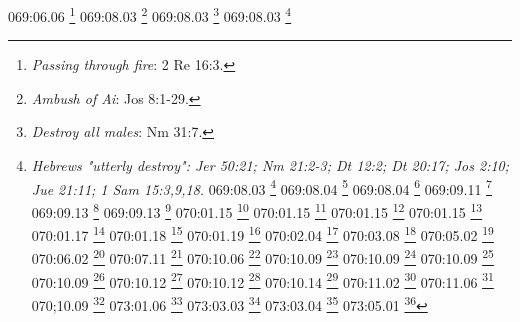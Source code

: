{{{{{{{{{{{{{{{{{{{069:06.06 \footnote{\textit{Passing through fire}: 2 Re 16:3.}
069:08.03 \footnote{\textit{Ambush of Ai}: Jos 8:1-29.}
069:08.03 \footnote{\textit{Destroy all males}: Nm 31:7.}
069:08.03 \footnote{\textit{Hebrews "utterly destroy": Jer 50:21; Nm 21:2-3; Dt 12:2; Dt 20:17; Jos 2:10; Jue 21:11; 1 Sam 15:3,9,18.}
069:08.03 \footnote{\textit{Raid upon Og}: Dt 3:1-7.}
069:08.04 \footnote{\textit{Capture females}: Nm 31:9,15-18; Dt 20:14.}
069:08.04 \footnote{\textit{Rules for captured wives}: Dt 21:10-14.}
069:09.11 \footnote{\textit{Wells & adjacent land}: Gn 21:25-30; Gn 26:19-22.}
069:09.13 \footnote{\textit{Curses if destroys landmark}: Dt 27:17.}
069:09.13 \footnote{\textit{Respect for landmarks}: Pr 22:28; Pr 23:10; Dt 19:14.}
070:01.15 \footnote{\textit{Barbarian raids}: Nm 31:3-31.}
070:01.15 \footnote{\textit{God of battles}: 1 Cr 14:15; 2 Cr 20:15; 2 Cr 32:8; Sal 24:8; Dt 7:21-23; Dt 20:1-4; 1 Sam 17:47.}
070:01.15 \footnote{\textit{In name of Lord God of Israel}: Nm 31:1-2; Dt 7:16-24; Dt 20:1; Jue 11:21,23; 1 Sam 15:2-3.}
070:01.15 \footnote{\textit{Sparing virgins}: Jue 21:10-12.}
070:01.17 \footnote{\textit{Slaughter}: Jue 4:16.}
070:01.18 \footnote{\textit{Foreskins dowry}: 1 Sam 18:25-27.}
070:01.19 \footnote{\textit{Champions}: 1 Sam 17:1-51.}
070:02.04 \footnote{\textit{God is love}: 1 Jn 4:8,16.}
070:03.08 \footnote{\textit{Stranger treated as local}: Lv 19:34.}
070:05.02 \footnote{\textit{Council of elders}: Gn 50:7; Ex 3:16-18.}
070:06.02 \footnote{\textit{Father of his people}: Gn 19:37-38; Gn 36:9,43; Nm 3:24.}
070:07.11 \footnote{\textit{New birth societies}: Jn 3:3,7; 1 P 1:23.}
070:10.06 \footnote{\textit{Fidelity test}: Nm 5:12-31.}
070:10.09 \footnote{\textit{Blood vengeance}: Dt 19:6,12; Jos 20:3-9.}
070:10.09 \footnote{\textit{Eye for eye}: Ex 21:23-24; Lv 24:20; Dt 19:21; Mt 5:38.}
070:10.09 \footnote{\textit{Life for life}: Ex 21:23.}
070:10.09 \footnote{\textit{Vengeance is God's}: Sal 94:1; Is 35:4; Nah 1:2; Dt 32:35,41,43.}
070:10.12 \footnote{\textit{money damages}: Ex 21:28.}
070:10.12 \footnote{\textit{Take no ransom for murderer}: Nm 35:31.}
070:10.14 \footnote{\textit{Burn adultress with fire}: Gn 38:24; Lv 21:9.}
070:11.02 \footnote{\textit{You shall not kill}: Ex 20:13; Dt 5:17.}
070:11.06 \footnote{\textit{It is the custom}: Jer 32:11; Jue 11:39.}
070;10.09 \footnote{\textit{Vengeance is God's}: Ro 12:19; Heb 10:30.}
073:01.06 \footnote{\textit{Mighty men of old}: Gn 6:4.}
073:03.03 \footnote{\textit{Mist would go up}: Gn 2:6.}
073:03.04 \footnote{\textit{Heads of rivers from Eden}: Gn 2:10.}
073:05.01 \footnote{\textit{East of Eden}: Gn 2:8; Gn 3:24.}
}}}}}}}}}}}}}}}}}}}}

